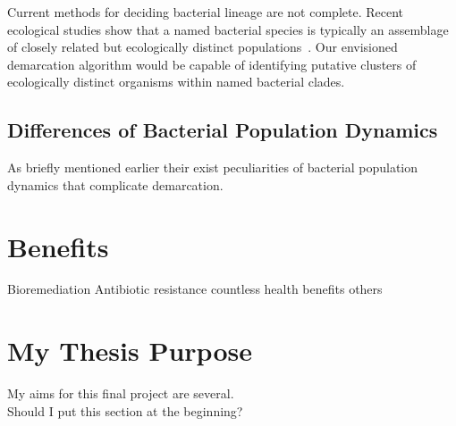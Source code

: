 Current methods for deciding bacterial lineage are not complete. Recent ecological studies %
show that a named bacterial species is typically an assemblage of closely related but ecologically %
distinct populations~\cite{cohan2007systematics}. Our envisioned demarcation algorithm would be capable %
of identifying putative clusters of ecologically distinct organisms within named bacterial clades.

\subsection{Differences of Bacterial Population Dynamics}
As briefly mentioned earlier their exist peculiarities of bacterial population dynamics that complicate %
demarcation.

\section{Benefits}%
Bioremediation
Antibiotic resistance
countless health benefits
others

\section{My Thesis Purpose}
My aims for this final project are several. \\ Should I put this section at the beginning?